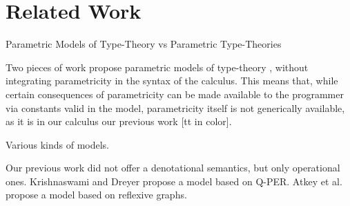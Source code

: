 \documentclass[english]{PaperTools/latex/lipics}
\begin{document}
\section{Related Work}


Parametric Models of Type-Theory vs Parametric Type-Theories

Two pieces of work propose parametric models of type-theory \citep{atkey_relationally_2014,krishnaswami_internalizing_2013}, without
integrating parametricity in the syntax of the calculus. This means
that, while certain consequences of parametricity can be made
available to the programmer via constants valid in the model,
parametricity itself is not generically available, as it is in our
calculus our previous work [tt in color].


Various kinds of models.

Our previous work did not offer a denotational semantics, but only
operational ones.  Krishnaswami and Dreyer propose a model based on
Q-PER.  Atkey et al. propose a model based on reflexive graphs.



\end{document}
